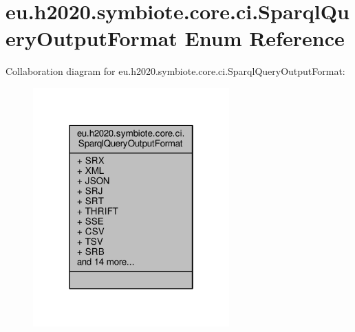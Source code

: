 \hypertarget{enumeu_1_1h2020_1_1symbiote_1_1core_1_1ci_1_1SparqlQueryOutputFormat}{}\section{eu.\+h2020.\+symbiote.\+core.\+ci.\+Sparql\+Query\+Output\+Format Enum Reference}
\label{enumeu_1_1h2020_1_1symbiote_1_1core_1_1ci_1_1SparqlQueryOutputFormat}


Collaboration diagram for eu.\+h2020.\+symbiote.\+core.\+ci.\+Sparql\+Query\+Output\+Format\+:
\nopagebreak
\begin{figure}[H]
\begin{center}
\leavevmode
\includegraphics[width=214pt]{enumeu_1_1h2020_1_1symbiote_1_1core_1_1ci_1_1SparqlQueryOutputFormat__coll__graph}
\end{center}
\end{figure}
